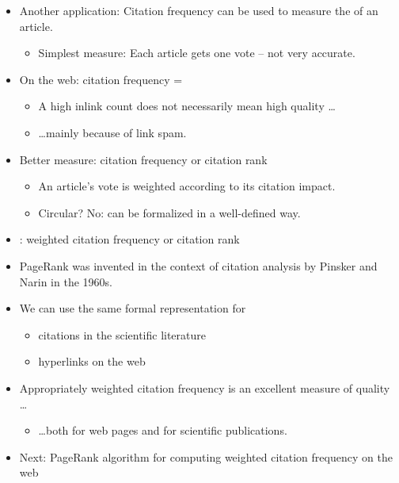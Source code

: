 \documentclass[a4paper,landscape,headrule,footrule,xetex]{foils}
\begin{document}

\begin{itemize}
\item Another application: Citation frequency can be used to measure
  the  of an article.
\begin{itemize}
\item Simplest measure: Each article gets one vote -- not
  very accurate.
\end{itemize}
\item On the web: citation frequency = 
\begin{itemize}
\item A high inlink count does not necessarily
  mean high quality \ldots
\item \ldots mainly because of link spam.
\end{itemize}
\item Better measure:  citation frequency or citation rank
\begin{itemize}
\item An article's vote is weighted according to its
  citation impact. 
\item Circular? No: can be formalized in a
  well-defined way.
\end{itemize}
\end{itemize}



\begin{itemize}
\item {}: weighted citation frequency or citation rank
\item PageRank was invented in the context of citation
  analysis by Pinsker and Narin in the 1960s.
\end{itemize}




\begin{itemize}
\item We can use the same formal representation for
\begin{itemize}
\item citations in the scientific literature
\item hyperlinks on the web
\end{itemize}
\item Appropriately weighted citation frequency is an
  excellent measure of  quality \ldots
\begin{itemize}
\item \ldots both for web pages and for scientific publications.
\end{itemize}
\item Next: PageRank algorithm for computing weighted
  citation frequency on the web
\end{itemize}
\end{document}

